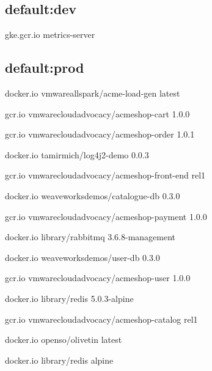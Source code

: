 \subsection{default:dev}

gke.gcr.io
metrics-server


\subsection{default:prod}

docker.io
vmwareallspark/acme-load-gen
latest


gcr.io
vmwarecloudadvocacy/acmeshop-cart
1.0.0


gcr.io
vmwarecloudadvocacy/acmeshop-order
1.0.1


docker.io
tamirmich/log4j2-demo
0.0.3


gcr.io
vmwarecloudadvocacy/acmeshop-front-end
rel1


docker.io
weaveworksdemos/catalogue-db
0.3.0


gcr.io
vmwarecloudadvocacy/acmeshop-payment
1.0.0


docker.io
library/rabbitmq
3.6.8-management


docker.io
weaveworksdemos/user-db
0.3.0


gcr.io
vmwarecloudadvocacy/acmeshop-user
1.0.0


docker.io
library/redis
5.0.3-alpine


gcr.io
vmwarecloudadvocacy/acmeshop-catalog
rel1


docker.io
openso/olivetin
latest


docker.io
library/redis
alpine

